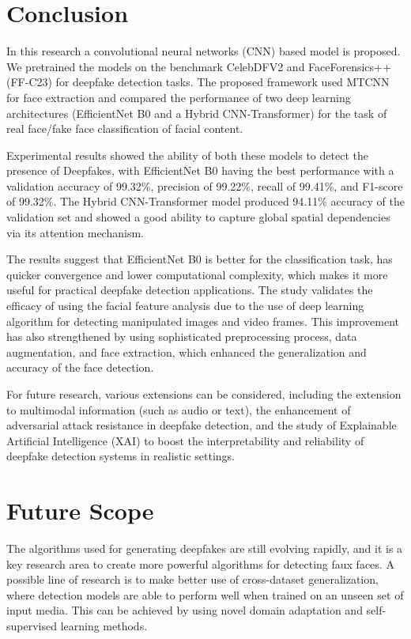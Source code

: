 \documentclass[conference]{IEEEtran}
\begin{document}
\section{Conclusion}

In this research a convolutional neural networks (CNN) based model is proposed.
We pretrained the models on the benchmark CelebDFV2 and FaceForensics++ (FF-C23) for deepfake detection tasks. The proposed framework used MTCNN for face extraction and compared the performance of two deep learning architectures (EfficientNet B0 and a Hybrid CNN-Transformer) for the task of real face/fake face classification of facial content.

Experimental results showed the ability of both these models to detect the presence of Deepfakes, with EfficientNet B0 having the best performance with a validation accuracy of 99.32\%, precision of 99.22\%, recall of 99.41\%, and F1-score of 99.32\%. The Hybrid CNN-Transformer model produced 94.11\% accuracy of the validation set and showed a good ability to capture global spatial dependencies via its attention mechanism.

The results suggest that EfficientNet B0 is better for the classification task, has quicker convergence and lower computational complexity, which makes it more useful for practical deepfake detection applications. The study validates the efficacy of using the facial feature analysis due to the use of deep learning algorithm for detecting manipulated images and video frames. This improvement has also strengthened by using sophisticated preprocessing process, data augmentation, and face extraction, which enhanced the generalization and accuracy of the face detection.

For future research, various extensions can be considered, including the extension to multimodal information (such as audio or text), the enhancement of adversarial attack resistance in deepfake detection, and the study of Explainable Artificial Intelligence (XAI) to boost the interpretability and reliability of deepfake detection systems in realistic settings.



\section{Future Scope}

The algorithms used for generating deepfakes are still evolving rapidly, and it is a key research area to create more powerful algorithms for detecting faux faces. A possible line of research is to make better use of cross-dataset generalization, where detection models are able to perform well when trained on an unseen set of input media. This can be achieved by using novel domain adaptation and self-supervised learning methods.
\end{document}
